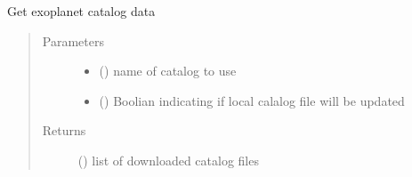 \documentclass[a4paper,11pt,english]{sphinxmanual}
\begin{document}
\begin{fulllineitems}
\label{\detokenize{cascade.exoplanet_tools:cascade.exoplanet_tools.exoplanet_tools.get_calalog}}
Get exoplanet catalog data
\begin{quote}\begin{description}
\item[{Parameters}] \leavevmode\begin{itemize}
\item {} 
 () \textendash{} name of catalog to use

\item {} 
 () \textendash{} Boolian indicating if local calalog file will be updated

\end{itemize}

\item[{Returns}] \leavevmode
{} () \textendash{} list of downloaded catalog files

\end{description}\end{quote}

\end{fulllineitems}

\end{document}
